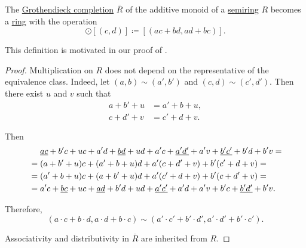 \begin{proposition}\label{thm:grothendieck_semiring_completion}
  The \hyperref[def:monoid_grothendieck_completion]{Grothendieck completion} \( \overline{R} \) of the additive monoid of a \hyperref[def:semiring]{semiring} \( R \) becomes a \hyperref[def:ring]{ring} with the operation
  \begin{equation*}
    [(a, b)] \odot [(c, d)] \coloneqq [(ac + bd, ad + bc)].
  \end{equation*}
\end{proposition}
\begin{comments}
  \item This definition is motivated in our proof of .
\end{comments}
\begin{proof}
  Multiplication on \( R \) does not depend on the representative of the equivalence class. Indeed, let \( (a, b) \sim (a', b') \) and \( (c, d) \sim (c', d') \). Then there exist \( u \) and \( v \) such that
  \begin{align*}
    a + b' + u &= a' + b + u, \\
    c + d' + v &= c' + d + v.
  \end{align*}

  Then
  \begin{align*}
    &\phantom{{}={}}
    \hi{ac} + b'c + uc + a'd + \hi{bd} + ud + a'c + \hi{a'd'} + a'v + \hi{b'c'} + b'd + b'v
    = \\ &=
    (a + b' + u)c + (a' + b + u)d + a'(c + d' + v) + b'(c' + d + v)
    = \\ &=
    (a' + b + u)c + (a + b' + u)d + a'(c' + d + v) + b'(c + d' + v)
    = \\ &=
    a'c + \hi{bc} + uc + \hi{ad} + b'd + ud + \hi{a'c'} + a'd + a'v + b'c + \hi{b'd'} + b'v.
  \end{align*}

  Therefore,
  \begin{equation*}
    (a \cdot c + b \cdot d, a \cdot d + b \cdot c) \sim (a' \cdot c' + b' \cdot d', a' \cdot d' + b' \cdot c').
  \end{equation*}

  Associativity and distributivity in \( \overline{R} \) are inherited from \( R \).
\end{proof}

